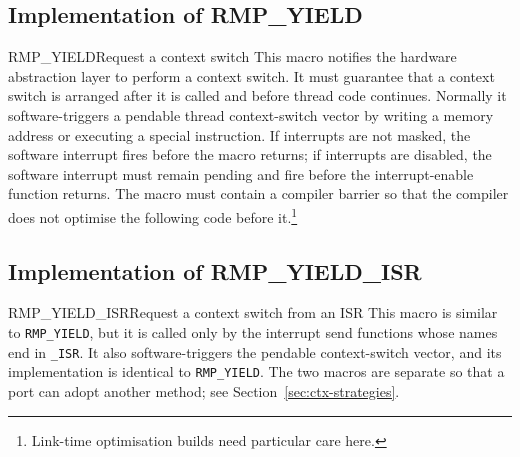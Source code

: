 \subsection{Implementation of RMP\_YIELD}

\begin{apidesc}{RMP\_YIELD}{Request a context switch}\label{port:Yield}
    This macro notifies the hardware abstraction layer to perform a context switch.
    It must guarantee that a context switch is arranged after it is called and before thread code continues.
    Normally it software-triggers a pendable thread context-switch vector by writing a memory address or executing a special instruction.
    If interrupts are not masked, the software interrupt fires before the macro returns; if interrupts are disabled, the software interrupt must remain pending and fire before the interrupt-enable function returns.
    The macro must contain a compiler barrier so that the compiler does not optimise the following code before it.\footnote{Link-time optimisation builds need particular care here.}
    \begin{apiparams}
    \end{apiparams}
    \begin{apiret}
    \end{apiret}
\end{apidesc}

\subsection{Implementation of RMP\_YIELD\_ISR}

\begin{apidesc}{RMP\_YIELD\_ISR}{Request a context switch from an ISR}\label{port:Yield_ISR}
    This macro is similar to \texttt{RMP\_YIELD}, but it is called only by the interrupt send functions whose names end in \texttt{\_ISR}.
    It also software-triggers the pendable context-switch vector, and its implementation is identical to \texttt{RMP\_YIELD}.
    The two macros are separate so that a port can adopt another method; see Section~\ref{sec:ctx-strategies}.
    \begin{apiparams}
    \end{apiparams}
    \begin{apiret}
    \end{apiret}
\end{apidesc}

